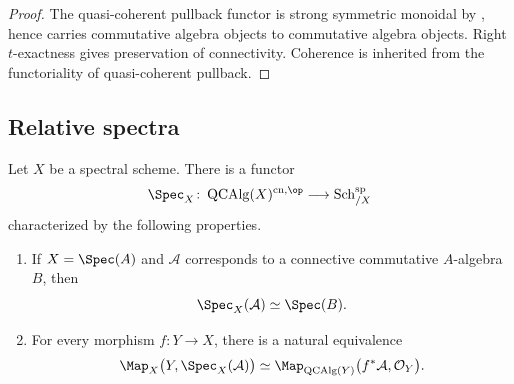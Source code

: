 \begin{proof}
The quasi-coherent pullback functor is strong symmetric monoidal by
, hence carries commutative algebra objects to
commutative algebra objects. Right $t$-exactness gives preservation of
connectivity. Coherence is inherited from the functoriality of
quasi-coherent pullback.
\end{proof}

\subsection{Relative spectra}

\begin{theorem}
\label{thm:relative-spectrum-construction}
Let $X$ be a spectral scheme. There is a functor
\[
    \Spec_X
    \colon
    \operatorname{QCAlg}(X)^{\mathrm{cn},\op}
    \longrightarrow
    \operatorname{Sch}^{\mathrm{sp}}_{/X}
\]
characterized by the following properties.
\begin{enumerate}[label=(\roman*)]
    \item If $X=\Spec(A)$ and $\mathcal A$ corresponds to a connective
    commutative $A$-algebra $B$, then
    \[
        \Spec_X(\mathcal A)
        \simeq
        \Spec(B).
    \]

    \item For every morphism $f:Y\to X$, there is a natural equivalence
    \[
        \Map_X
        \bigl(
            Y,
            \Spec_X(\mathcal A)
        \bigr)
        \simeq
        \Map_{\operatorname{QCAlg}(Y)}
        \bigl(
            f^*\mathcal A,
            \mathcal O_Y
        \bigr).
    \]
\end{enumerate}
\end{theorem}

